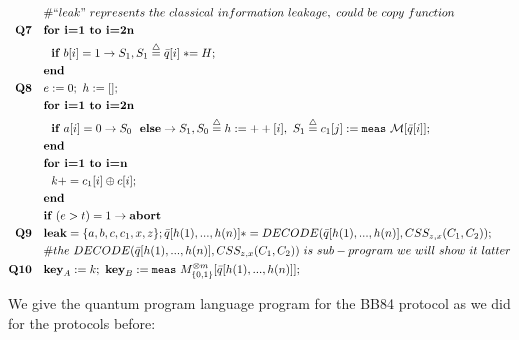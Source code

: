 \documentclass{report}
\theoremstyle{defn_style}
\newcommand{\asteq}{\mathrel{*}=}
\begin{document}
\begin{tcolorbox}[colframe=black!75!black, colback=white, title=CSS Code Protocol: Quantum Language Representation]
\begin{align*}
    &\# ``leak"~represents~the~classical~information~leakage,~could~be~copy~function \\
    \textbf{Q7} \quad &\textbf{for~i=1~to~i=2n}\\
    &~~ \textbf{if }  b[i] = 1 \rightarrow S_1 ,S_1\stackrel{\triangle}{=}\bar{q}[i] \asteq H;\\
    &\textbf{end} \\
    \textbf{Q8} \quad & e:=0;~h:=[];\\
    &\textbf{for~i=1~to~i=2n}\\
    &~~ \textbf{if }  a[i] = 0 \rightarrow S_0\ ~\textbf{else}\rightarrow S_1 ,S_0\stackrel{\triangle}{=}h:=++[i],~S_1\stackrel{\triangle}{=}c_1[j]:=\texttt{meas} 
    ~ \mathcal{M}[\bar{q}[i]] ;\\
    &\textbf{end} \\ 
    & \textbf{for~i=1~to~i=n}\\
    &~~ k += c_1[i] \oplus c[i];\\
    &\textbf{end}\\
    & \textbf{if }  (e>t) = 1 \rightarrow \textbf{abort} \; \\
    \textbf{Q9}  \quad & \textbf{leak}=\{a, b, c, c_1, x, z\}; \bar{q}[h(1),...,h(n)] *=DECODE(\bar{q}[h(1),...,h(n)],CSS_{z,x}(C_1,C_2)); \\
    &\#the~DECODE(\bar{q}[h(1),...,h(n)],CSS_{z,x}(C_1,C_2))~is~sub-program~we~will~show~it~latter\\
    \textbf{Q10} \quad & \textbf{key}_{A}:=k;~\textbf{key}_{B}:=\texttt{meas} 
    ~ M^{\otimes m}_{\{0,1\}}[ \bar{q}[h(1),...,h(n)]];
\end{align*}
\end{tcolorbox}



We give the quantum program language program for the BB84 protocol as we did for the protocols before:
\end{document}
